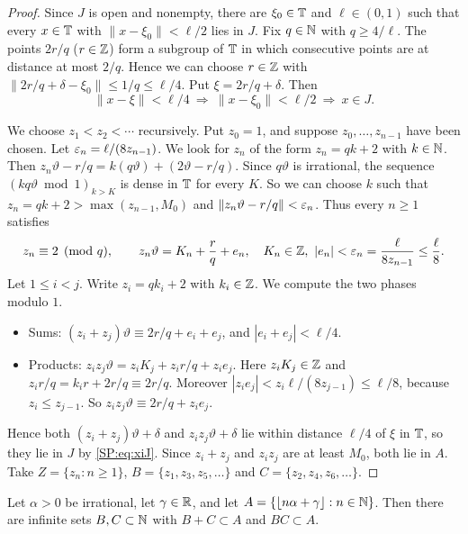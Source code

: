 \begin{proof}
Since $J$ is open and nonempty, there are $\xi_0\in\mathbb{T}$ and $\ell\in(0,1)$ such that every
$x\in\mathbb{T}$ with $\|x-\xi_0\|<\ell/2$ lies in $J$. Fix $q\in\mathbb{N}$ with $q\ge 4/\ell$.
The points $2r/q$ ($r\in\mathbb{Z}$) form a subgroup of $\mathbb{T}$ in which consecutive points are at distance
at most $2/q$. Hence we can choose $r\in\mathbb{Z}$ with $\|2r/q+\delta-\xi_0\|\le 1/q\le\ell/4$.
Put $\xi=2r/q+\delta$. Then
\begin{equation}\label{SP:eq:xiJ}
\|x-\xi\|<\ell/4\ \Longrightarrow\ \|x-\xi_0\|<\ell/2\ \Longrightarrow\ x\in J .
\end{equation}

We choose $z_1<z_2<\cdots$ recursively. Put $z_0=1$, and suppose $z_0,\dots,z_{n-1}$ have been
chosen. Let $\varepsilon_n=\ell/(8z_{n-1})$. We look for $z_n$ of the form $z_n=qk+2$ with $k\in\mathbb{N}$.
Then $z_n\vartheta-r/q=k(q\vartheta)+(2\vartheta-r/q)$. Since $q\vartheta$ is irrational, the
sequence $(kq\vartheta\bmod1)_{k>K}$ is dense in $\mathbb{T}$ for every $K$. So we can choose $k$ such that
$z_n=qk+2>\max(z_{n-1},M_0)$ and $\|z_n\vartheta-r/q\|<\varepsilon_n$.
Thus every $n\ge1$ satisfies
\[
z_n\equiv 2\pmod q,\qquad z_n\vartheta=K_n+\frac rq+e_n,\quad K_n\in\Z,\ |e_n|<\eps_n=\frac{\ell}{8z_{n-1}}\le\frac\ell8 .
\]
Let $1\le i<j$. Write $z_i=qk_i+2$ with $k_i\in\mathbb{Z}$. We compute the two phases modulo $1$.
\begin{itemize}
\item Sums: $(z_i+z_j)\vartheta\equiv 2r/q+e_i+e_j$, and $|e_i+e_j|<\ell/4$.
\item Products: $z_iz_j\vartheta=z_iK_j+z_ir/q+z_ie_j$. Here $z_iK_j\in\mathbb{Z}$ and
$z_ir/q=k_ir+2r/q\equiv 2r/q$. Moreover $|z_ie_j|<z_i\ell/(8z_{j-1})\le\ell/8$, because
$z_i\le z_{j-1}$. So $z_iz_j\vartheta\equiv 2r/q+z_ie_j$.
\end{itemize}
Hence both $(z_i+z_j)\vartheta+\delta$ and $z_iz_j\vartheta+\delta$ lie within distance
$\ell/4$ of $\xi$ in $\mathbb{T}$, so they lie in $J$ by \eqref{SP:eq:xiJ}. Since
$z_i+z_j$ and $z_iz_j$ are at least $M_0$, both lie in $A$.
Take $Z=\{z_n:n\ge1\}$, $B=\{z_1,z_3,z_5,\dots\}$ and $C=\{z_2,z_4,z_6,\dots\}$.
\end{proof}

\begin{corollary}\label{SP:cor:beatty}
Let $\alpha>0$ be irrational, let $\gamma\in\mathbb{R}$, and let
$A=\{\lfloor n\alpha+\gamma\rfloor:n\in\mathbb{N}\}$. Then there are infinite sets $B,C\subset\mathbb{N}$ with
$B+C\subset A$ and $BC\subset A$.
\end{corollary}

